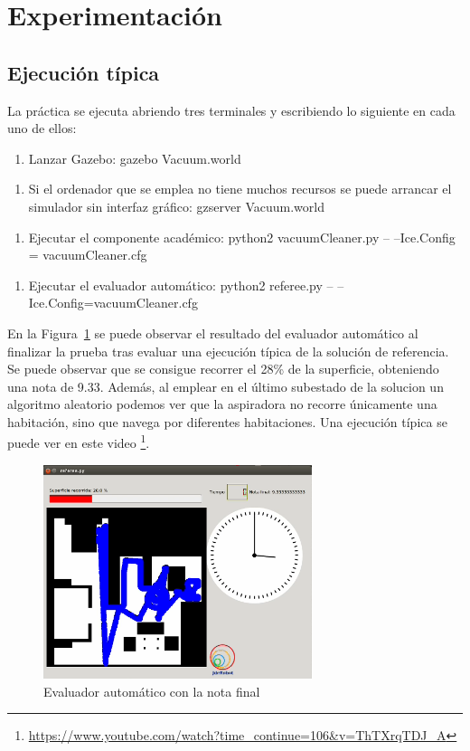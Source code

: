 \section{Experimentación}

\subsection{Ejecución típica}
La práctica se ejecuta abriendo tres terminales y escribiendo lo siguiente en cada uno de ellos: 
\begin{enumerate}[1.]
    \item Lanzar Gazebo: gazebo Vacuum.world
\end{enumerate}
\begin{enumerate}[1b.]
\item Si el ordenador que se emplea no tiene muchos recursos se puede arrancar el simulador sin interfaz gráfico: gzserver Vacuum.world
\end{enumerate}
\begin{enumerate}[2.]
    \item Ejecutar el componente académico: python2 vacuumCleaner.py -- --Ice.Config = vacuumCleaner.cfg
\end{enumerate}
\begin{enumerate}[3.]
  	\item Ejecutar el evaluador automático: python2 referee.py -- --Ice.Config=vacuumCleaner.cfg
 \end{enumerate}

En la Figura~\ref{fig.Referee_Roomba} se puede observar el resultado del evaluador automático al finalizar la prueba tras evaluar una ejecución típica de la solución de referencia. Se puede observar que se consigue recorrer el 28\% de  la superficie, obteniendo una nota de 9.33. Además, al emplear en el último subestado de la solucion un algoritmo aleatorio podemos ver que la aspiradora no recorre únicamente una habitación, sino que navega por diferentes habitaciones. Una ejecución típica se puede ver en este video \footnote{\url{https://www.youtube.com/watch?time_continue=106&v=ThTXrqTDJ_A}}. 

\begin{figure}[H]
  \begin{center}
    \includegraphics[width=0.7\textwidth]{figures/Vacuum/Referee_Roomba.png}
		\caption{Evaluador automático con la nota final}
		\label{fig.Referee_Roomba}
		\end{center}
\end{figure}

